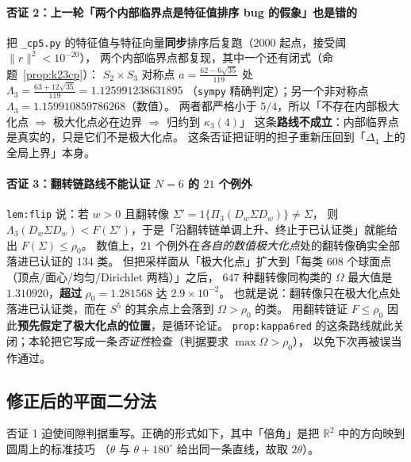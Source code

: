 \documentclass[UTF8,11pt]{ctexart}
\theoremstyle{definition}
\newcommand{\Lam}{\Lambda}
\newcommand{\R}{\mathbb{R}}
\begin{document}
\paragraph{否证 2：上一轮「两个内部临界点是特征值排序 bug 的假象」也是错的}
把 \texttt{\_cp5.py} 的特征值与特征向量\textbf{同步}排序后复跑（$2000$ 起点，接受阈 $\|r\|^2<10^{-20}$），
两个内部临界点都复现，其中一个还有闭式（命题~\ref{prop:k23cp}）：
$S_2\times S_3$ 对称点 $a=\frac{62-6\sqrt{35}}{119}$ 处 $\Lam_3=\frac{63+12\sqrt{35}}{119}=1.125991238631895$
（\texttt{sympy} 精确判定）；另一个非对称点 $\Lam_3=1.159910859786268$（数值）。
两者都严格小于 $5/4$，所以「不存在内部极大化点 $\Rightarrow$ 极大化点必在边界 $\Rightarrow$ 归约到 $\kappa_3(4)$」
这条\textbf{路线不成立}：内部临界点是真实的，只是它们不是极大化点。
这条否证把证明的担子重新压回到「$\Delta_4$ 上的全局上界」本身。

\paragraph{否证 3：翻转链路线不能认证 $N=6$ 的 $21$ 个例外}
\texttt{lem:flip} 说：若 $w>0$ 且翻转像 $\Sigma'=1\{\Pi_3(D_w\Sigma D_w)\}\ne\Sigma$，
则 $\Lam_3(D_w\Sigma D_w)<F(\Sigma')$，于是「沿翻转链单调上升、终止于已认证类」就能给出 $F(\Sigma)\le\rho_0$。
数值上，$21$ 个例外在\emph{各自的数值极大化点}处的翻转像确实全部落进已认证的 $134$ 类。
但把采样面从「极大化点」扩大到「每类 $608$ 个球面点（顶点/面心/均匀/Dirichlet 两档）」之后，
$647$ 种翻转像同构类的 $\Omega$ 最大值是 $\mathbf{1.310920}$，\textbf{超过} $\rho_0=1.281568$ 达 $2.9\times10^{-2}$。
也就是说：翻转像只在极大化点处落进已认证类，而在 $S^5$ 的其余点上会落到 $\Omega>\rho_0$ 的类。
用翻转链证 $F\le\rho_0$ 因此\textbf{预先假定了极大化点的位置}，是循环论证。
\texttt{prop:kappa6red} 的这条路线就此关闭；本轮把它写成一条\emph{否证性}检查（判据要求 $\max\Omega>\rho_0$），
以免下次再被误当作通过。

\subsection{修正后的平面二分法}\label{sec:planarfix}

否证 1 迫使间隙判据重写。正确的形式如下，其中「倍角」是把 $\R^2$ 中的方向映到圆周上的标准技巧
（$\theta$ 与 $\theta+180^\circ$ 给出同一条直线，故取 $2\theta$）。
\end{document}

